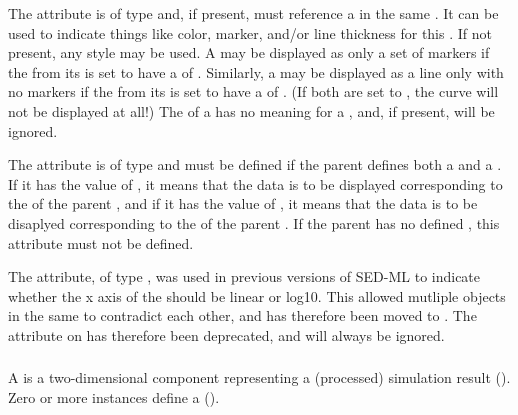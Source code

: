 \begin{blockChanged}
The  attribute is of type  and, if present, must reference a \Style in the same \SedDocument.  It can be used to indicate things like color, marker, and/or line thickness for this \Curve.  If not present, any style may be used.  A \Curve may be displayed as only a set of markers if the \Line from its \Style is set to have a  of .  Similarly, a \Curve may be displayed as a line only with no markers if the \Marker from its \Style is set to have a  of .  (If both are set to , the curve will not be displayed at all!)  The \Fill of a \Style has no meaning for a \Curve, and, if present, will be ignored.

The  attribute is of type  and must be defined if the parent \Plot defines both a  and a .  If it has the value of , it means that the data is to be displayed corresponding to the  of the parent \Plot, and if it has the value of , it means that the data is to be disaplyed corresponding to the  of the parent \Plot.  If the parent \Plot has no defined , this attribute must not be defined.

The  attribute, of type , was used in previous versions of SED-ML to indicate whether the x axis of the \Plot should be linear or log10.  This allowed mutliple \Curve objects in the same \Plot to contradict each other, and has therefore been moved to \Plot.  The  attribute on \Curve has therefore been deprecated, and will always be ignored.

\end{blockChanged}


\subsubsection{}
\label{class:curve}
A \Curve is a two-dimensional \Output component representing a (processed) simulation result (). Zero or more \Curve instances define a \PlotTwo (). 

